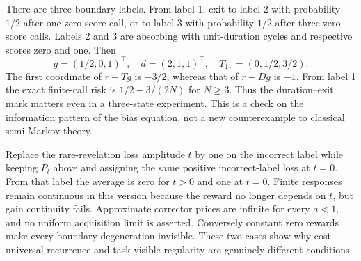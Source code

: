 \begin{example}\label{ex:marked}
There are three boundary labels. From label 1, exit to label 2 with probability $1/2$ after one zero-score call, or to label 3 with probability $1/2$ after three zero-score calls. Labels 2 and 3 are absorbing with unit-duration cycles and respective scores zero and one. Then
\[
 g=(1/2,0,1)^\top,\quad d=(2,1,1)^\top,\quad
 T_{1\cdot}=(0,1/2,3/2).
\]
The first coordinate of $r-Tg$ is $-3/2$, whereas that of $r-Dg$ is $-1$. From label 1 the exact finite-call risk is $1/2-3/(2N)$ for $N\ge3$. Thus the duration--exit mark matters even in a three-state experiment. This is a check on the information pattern of the bias equation, not a new counterexample to classical semi-Markov theory.
\end{example}

\begin{example}\label{ex:discontinuity}
Replace the rare-revelation loss amplitude $t$ by one on the incorrect label while keeping $P_t$ above and assigning the same positive incorrect-label loss at $t=0$. From that label the average is zero for $t>0$ and one at $t=0$. Finite responses remain continuous in this version because the reward no longer depends on $t$, but gain continuity fails. Approximate corrector prices are infinite for every $a<1$, and no uniform acquisition limit is asserted. Conversely constant zero rewards make every boundary degeneration invisible. These two cases show why cost-universal recurrence and task-visible regularity are genuinely different conditions.
\end{example}
